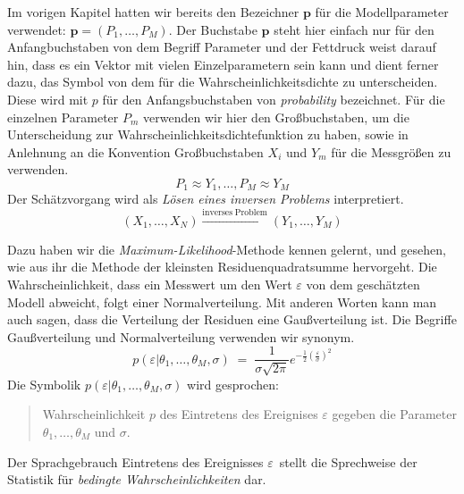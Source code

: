 Im vorigen Kapitel hatten wir bereits den Bezeichner $\mathbf{p}$ für die Modellparameter
verwendet: $\mathbf{p} = (P_1, \dots, P_M)$.
Der Buchstabe $\mathbf{p}$ steht hier einfach nur für den Anfangbuchstaben
von dem Begriff Parameter und der Fettdruck weist darauf hin, dass es ein Vektor mit vielen
Einzelparametern sein kann und dient ferner dazu, das Symbol von dem für die Wahrscheinlichkeitsdichte
zu unterscheiden. Diese wird mit $p$ für den Anfangsbuchstaben von \textsl{probability} bezeichnet.
Für die einzelnen Parameter $P_m$ verwenden wir hier den Großbuchstaben, um die Unterscheidung zur
Wahrscheinlichkeitsdichtefunktion zu haben, sowie in Anlehnung an die Konvention Großbuchstaben
$X_i$ und $Y_m$ für die Messgrößen zu verwenden.
\begin{equation}
P_1 \approx Y_1, \dots, P_M \approx Y_M
\end{equation}
Der Schätzvorgang wird als \textsl{Lösen eines inversen Problems} interpretiert.
\begin{equation}
(X_1, \dots, X_N) \xrightarrow{\mathrm{inverses \; Problem}} (Y_1, \dots, Y_M)
\label{inverseProblemEq}
\end{equation}

Dazu haben wir die \textsl{Maximum-Likelihood}-Methode kennen gelernt, und gesehen, wie
aus ihr die Methode der kleinsten Residuenquadratsumme hervorgeht. Die Wahrscheinlichkeit,
dass ein Messwert um den Wert $\varepsilon$ von dem geschätzten Modell abweicht, folgt
einer Normalverteilung. Mit anderen Worten kann man auch sagen, dass
die Verteilung der Residuen eine Gaußverteilung ist.
Die Begriffe Gaußverteilung und Normalverteilung verwenden wir synonym.
\begin{equation}
p(\varepsilon | \theta_1,\dots,\theta_M, \sigma) \; = \; \frac{1}{\sigma \sqrt{2 \pi}}
e^{-\frac{1}{2} \left(\frac{\varepsilon}{\sigma}\right)^2}
\label{Maximumlikelihood1}
\end{equation}
Die Symbolik $p(\varepsilon | \theta_1,\dots,\theta_M, \sigma)$ wird gesprochen:
\begin{quote}
Wahrscheinlichkeit $p$ des Eintretens des Ereignises $\varepsilon$
gegeben die Parameter $\theta_1,\dots,\theta_M$ und $\sigma$.
\end{quote}
Der Sprachgebrauch \glqq Eintretens des Ereignisses $\varepsilon$\grqq ~stellt die
Sprechweise der Statistik für \textsl{bedingte Wahrscheinlichkeiten} dar.

